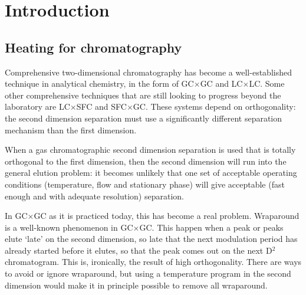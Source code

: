 \documentclass[aip,rsi,preprint,graphicx]{revtex4-1} %
\begin{document}
\maketitle %


\section{Introduction}
\label{Introduction}

\subsection{Heating for chromatography}

Comprehensive two-dimensional chromatography has become a well-established technique in analytical chemistry, in the form of GC$\times$GC and LC$\times$LC. Some other comprehensive techniques that are still looking to progress beyond the laboratory are LC$\times$SFC and SFC$\times$GC. These systems depend on orthogonality: the second dimension separation must use a significantly different separation mechanism than the first dimension.

When a gas chromatographic second dimension separation is used that is totally orthogonal to the first dimension, then the second dimension will run into the general elution problem: it becomes unlikely that one set of acceptable operating conditions (temperature, flow and stationary phase) will give acceptable (fast enough and with adequate resolution) separation.

In GC$\times$GC as it is practiced today, this has become a real problem. Wraparound is a well-known phenomenon in GC$\times$GC\cite{Dalluege2003}. This happen when a peak or peaks elute `late' on the second dimension, so late that the next modulation period has already started before it elutes, so that the peak comes out on the next D$^2$ chromatogram. This is, ironically, the result of high orthogonality. There are ways to avoid or ignore wraparound, but using a temperature program in the second dimension would make it in principle possible to remove all wraparound. 
\end{document}
